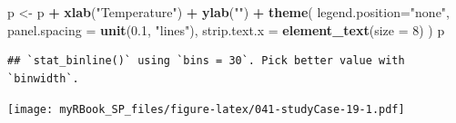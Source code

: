 \documentclass[
]{book}
\newenvironment{Shaded}{\begin{snugshade}}{\end{snugshade}}
\newcommand{\DataTypeTok}[1]{\textcolor[rgb]{0.13,0.29,0.53}{#1}}
\newcommand{\DecValTok}[1]{\textcolor[rgb]{0.00,0.00,0.81}{#1}}
\newcommand{\FloatTok}[1]{\textcolor[rgb]{0.00,0.00,0.81}{#1}}
\newcommand{\KeywordTok}[1]{\textcolor[rgb]{0.13,0.29,0.53}{\textbf{#1}}}
\newcommand{\NormalTok}[1]{#1}
\newcommand{\OperatorTok}[1]{\textcolor[rgb]{0.81,0.36,0.00}{\textbf{#1}}}
\newcommand{\StringTok}[1]{\textcolor[rgb]{0.31,0.60,0.02}{#1}}
\begin{document}
\begin{Shaded}
\begin{Highlighting}[]
\NormalTok{p <-}\StringTok{ }\NormalTok{p }\OperatorTok{+}\StringTok{ }\KeywordTok{xlab}\NormalTok{(}\StringTok{"Temperature"}\NormalTok{) }\OperatorTok{+}\StringTok{ }\KeywordTok{ylab}\NormalTok{(}\StringTok{""}\NormalTok{) }\OperatorTok{+}
\StringTok{    }\KeywordTok{theme}\NormalTok{(}
      \DataTypeTok{legend.position=}\StringTok{"none"}\NormalTok{,}
      \DataTypeTok{panel.spacing =} \KeywordTok{unit}\NormalTok{(}\FloatTok{0.1}\NormalTok{, }\StringTok{"lines"}\NormalTok{),}
      \DataTypeTok{strip.text.x =} \KeywordTok{element_text}\NormalTok{(}\DataTypeTok{size =} \DecValTok{8}\NormalTok{)}
\NormalTok{    ) }
\NormalTok{p}
\end{Highlighting}
\end{Shaded}

\begin{verbatim}
## `stat_binline()` using `bins = 30`. Pick better value with `binwidth`.
\end{verbatim}

\texttt{[image: myRBook\_SP\_files/figure-latex/041-studyCase-19-1.pdf]}
\end{document}
